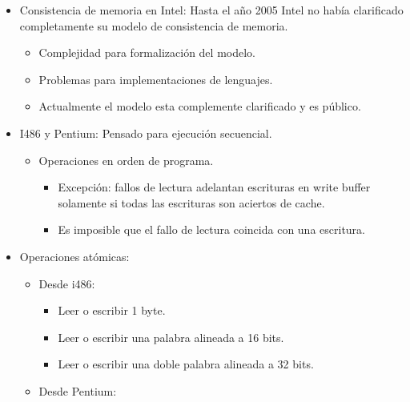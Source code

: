\documentclass[12pt, twoside, openright]{report} %
\begin{document}
    \begin{itemize}
    
    \item
      Consistencia de memoria en Intel: Hasta el año 2005 Intel no
      había clarificado completamente su modelo de consistencia de
      memoria.

      \begin{itemize}
      
      \item
        Complejidad para formalización del modelo.
      \item
        Problemas para implementaciones de lenguajes.
      \item
        Actualmente el modelo esta complemente clarificado y es
        público.
      \end{itemize}
    \item
      I486 y Pentium: Pensado para ejecución secuencial.

      \begin{itemize}
      
      \item
        Operaciones en orden de programa.

        \begin{itemize}
        
        \item
          Excepción: fallos de lectura adelantan escrituras en write
          buffer solamente si todas las escrituras son aciertos de
          cache.
        \item
          Es imposible que el fallo de lectura coincida con una
          escritura.
        \end{itemize}
      \end{itemize}
    \item
      Operaciones atómicas:

      \begin{itemize}
      
      \item
        Desde i486:

        \begin{itemize}
        
        \item
          Leer o escribir 1 byte.
        \item
          Leer o escribir una palabra alineada a 16 bits.
        \item
          Leer o escribir una doble palabra alineada a 32 bits.
        \end{itemize}
      \item
        Desde Pentium:


\end{itemize}
\end{itemize}
\end{document}
